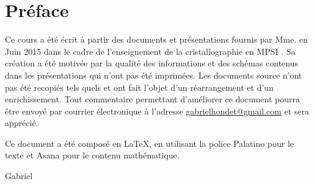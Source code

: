 \chapter{Préface}
Ce cours a été écrit à partir des documents et présentations fournis par Mme.
en Juin 2015 dans le cadre de l’enseignement de la cristallographie en MPSI . Sa création
a été motivée par la qualité des informations et des schémas contenus dans les
présentations qui n’ont pas été imprimées. Les documents source n’ont pas été recopiés
tels quels et ont fait l’objet d’un réarrangement et d’un enrichissement. Tout
commentaire permettant d’améliorer ce document pourra être envoyé par courrier électronique
à l’adresse \url{gabrielhondet@gmail.com} et sera apprécié.


Ce document a été composé en \LaTeX{}, en utilisant la police Palatino pour le
texte et Asana pour le contenu mathématique.

\hfill Gabriel 
